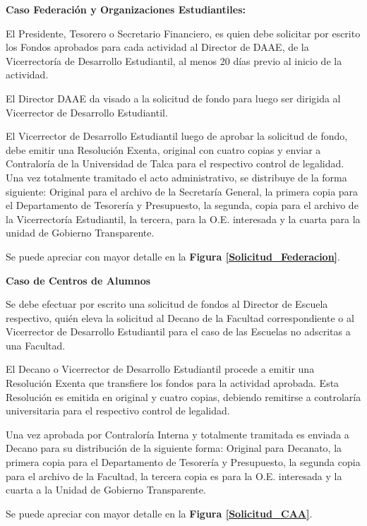 \begin{tasks}[counter-format = {tsk[A].}]
	\task \textbf{Caso Federación y Organizaciones Estudiantiles:}

	El Presidente, Tesorero o Secretario Financiero, es quien debe solicitar por escrito los Fondos aprobados para cada actividad al Director de DAAE, de la Vicerrectoría de Desarrollo Estudiantil, al menos 20 días previo al inicio de la actividad.

	El Director DAAE da visado a la solicitud de fondo para luego ser dirigida al Vicerrector de Desarrollo Estudiantil.

	El Vicerrector de Desarrollo Estudiantil luego de aprobar la solicitud de fondo, debe emitir una Resolución Exenta, original con cuatro copias y enviar a Contraloría de la Universidad de Talca para el respectivo control de legalidad. Una vez totalmente tramitado el acto administrativo, se distribuye de la forma siguiente: Original para el archivo de la Secretaría General, la primera copia  para el Departamento de Tesorería y Presupuesto, la segunda, copia para el archivo de la Vicerrectoría Estudiantil, la tercera, para la O.E. interesada y la cuarta para la unidad de Gobierno Transparente.

	Se puede apreciar con mayor detalle en la \textbf{Figura \ref{Solicitud_Federacion}}.

	\task \textbf{Caso de Centros de Alumnos}

	Se debe efectuar por escrito una solicitud de fondos al Director de Escuela respectivo, quién eleva la solicitud al Decano de la Facultad correspondiente o al Vicerrector de Desarrollo Estudiantil para el caso de las Escuelas no adscritas a una Facultad.

	El Decano o Vicerrector de Desarrollo Estudiantil procede a emitir una Resolución Exenta que transfiere los fondos para la actividad aprobada. Esta Resolución es emitida en original y cuatro copias, debiendo remitirse a controlaría universitaria para el respectivo control de legalidad.

	Una vez aprobada por Contraloría Interna y totalmente tramitada es enviada a Decano para su distribución de la siguiente forma: Original para Decanato, la primera copia para el Departamento de Tesorería y Presupuesto, la segunda copia para el archivo de la Facultad, la tercera copia es para la O.E. interesada y la cuarta a la Unidad de Gobierno Transparente.

	Se puede apreciar con mayor detalle en la \textbf{Figura \ref{Solicitud_CAA}}.
\end{tasks}

